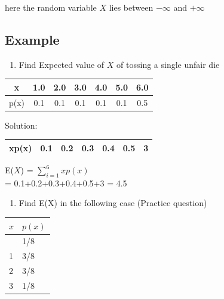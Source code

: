 \documentclass[
]{book}
\providecommand{\tightlist}{%
  \setlength{\itemsep}{0pt}\setlength{\parskip}{0pt}}
\begin{document}
here the random variable \(X\) lies between \({-\infty}\) and \({+\infty}\)

\hypertarget{example-5}{%
\subsection*{Example}\label{example-5}}

\begin{enumerate}
\def\labelenumi{\arabic{enumi}.}
\tightlist
\item
  Find Expected value of \(X\) of tossing a single unfair die
\end{enumerate}

\begin{table}[H]
\centering\centering
\begin{tabular}[t]{c|c|c|c|c|c|c}
\hline
x & 1.0 & 2.0 & 3.0 & 4.0 & 5.0 & 6.0\\
\hline
p(x) & 0.1 & 0.1 & 0.1 & 0.1 & 0.1 & 0.5\\
\hline
\end{tabular}
\end{table}

Solution:

\begin{table}[H]
\centering\centering
\begin{tabular}[t]{c|c|c|c|c|c|c}
\hline
xp(x) & 0.1 & 0.2 & 0.3 & 0.4 & 0.5 & 3\\
\hline
\end{tabular}
\end{table}

E(\(X\)) = \(\sum_{i = 1}^{6}xp(x)\)\\
= 0.1+0.2+0.3+0.4+0.5+3 = 4.5

\begin{enumerate}
\def\labelenumi{\arabic{enumi}.}
\setcounter{enumi}{1}
\tightlist
\item
  Find E(X) in the following case (Practice question)
\end{enumerate}

\begin{longtable}[]{@{}ll@{}}
\toprule\noalign{}
\(x\) & \(p(x)\) \\
\midrule\noalign{}
\endhead
\bottomrule\noalign{}
\endlastfoot
0 & 1/8 \\
1 & 3/8 \\
2 & 3/8 \\
3 & 1/8 \\
\end{longtable}
\end{document}

